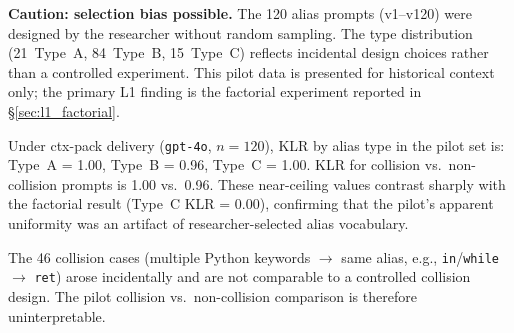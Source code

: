 \textbf{Caution: selection bias possible.} The 120 alias prompts (v1--v120) were designed by the researcher without random sampling. The type distribution (21~Type~A, 84~Type~B, 15~Type~C) reflects incidental design choices rather than a controlled experiment. This pilot data is presented for historical context only; the primary L1 finding is the factorial experiment reported in \S\ref{sec:l1_factorial}.

Under ctx-pack delivery (\texttt{gpt-4o}, $n=120$), KLR by alias type in the pilot set is: Type~A = 1.00, Type~B = 0.96, Type~C = 1.00. KLR for collision vs.\ non-collision prompts is 1.00 vs.\ 0.96. These near-ceiling values contrast sharply with the factorial result (Type~C KLR = 0.00), confirming that the pilot's apparent uniformity was an artifact of researcher-selected alias vocabulary.

The 46 collision cases (multiple Python keywords $\to$ same alias, e.g., \texttt{in}/\texttt{while} $\to$ \texttt{ret}) arose incidentally and are not comparable to a controlled collision design. The pilot collision vs.\ non-collision comparison is therefore uninterpretable.
